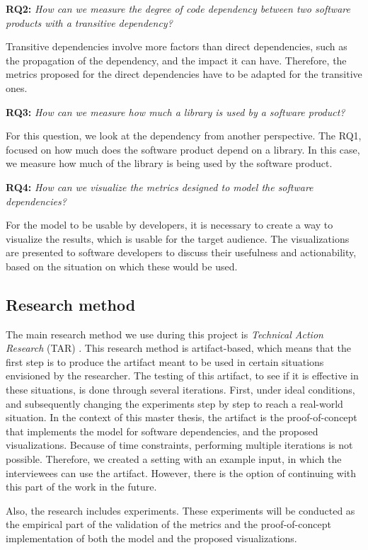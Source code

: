 \blankl
\textbf{RQ2:} \textit{How can we measure the degree of code dependency between two software products with a transitive dependency?}

\blankls
Transitive dependencies involve more factors than direct dependencies, such as the propagation of the dependency, and the impact it can have. Therefore, the metrics proposed for the direct dependencies have to be adapted for the transitive ones.

\blankl
\textbf{RQ3:} \textit{How can we measure how much a library is used by a software product?}

\blankls
For this question, we look at the dependency from another perspective. The RQ1, focused on how much does the software product depend on a library. In this case, we measure how much of the library is being used by the software product.

\blankl
\textbf{RQ4:} \textit{How can we visualize the metrics designed to model the software dependencies?}

\blankls
For the model to be usable by developers, it is necessary to create a way to visualize the results, which is usable for the target audience. The visualizations are presented to software developers to discuss their usefulness and actionability, based on the situation on which these would be used.

\subsection{Research method}
The main research method we use during this project is \textit{Technical Action Research} (TAR) \cite{wieringa2012technical}.
This research method is artifact-based, which means that the first step is to produce the artifact meant to be used in certain situations envisioned by the researcher. The testing of this artifact, to see if it is effective in these situations, is done through several iterations. First, under ideal conditions, and subsequently changing the experiments step by step to reach a real-world situation. In the context of this master thesis, the artifact is the proof-of-concept that implements the model for software dependencies, and the proposed visualizations. Because of time constraints, performing multiple iterations is not possible. Therefore, we created a setting with an example input, in which the interviewees can use the artifact. However, there is the option of continuing with this part of the work in the future.

\blankl
Also, the research includes experiments. These experiments will be conducted as the empirical part of the validation of the metrics and the proof-of-concept implementation of both the model and the proposed visualizations.

